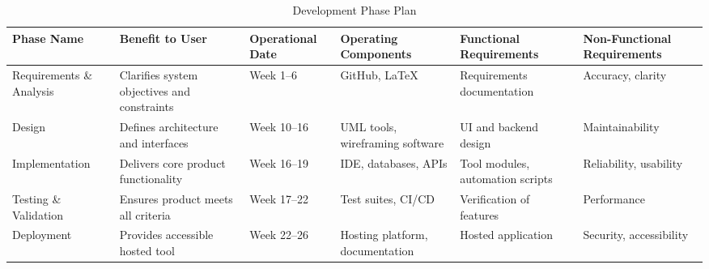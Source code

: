 \documentclass[12pt]{article}
\newcommand{\lips}{\textit{Insert your content here.}}
\begin{document}
\begin{table}[h!]
\centering
\caption{Development Phase Plan}
\begin{tabularx}{\textwidth}{lXlXlX}
\toprule
\textbf{Phase Name} & \textbf{Benefit to User} & \textbf{Operational Date} & \textbf{Operating Components} & \textbf{Functional Requirements} & \textbf{Non-Functional Requirements} \\
\midrule
Requirements \& Analysis & Clarifies system objectives and constraints & Week 1–6 & GitHub, LaTeX & Requirements documentation & Accuracy, clarity \\
Design & Defines architecture and interfaces & Week 10–16 & UML tools, wireframing software & UI and backend design & Maintainability \\
Implementation & Delivers core product functionality & Week 16–19 & IDE, databases, APIs & Tool modules, automation scripts & Reliability, usability \\
Testing \& Validation & Ensures product meets all criteria & Week 17–22 & Test suites, CI/CD & Verification of features & Performance \\
Deployment & Provides accessible hosted tool & Week 22–26 & Hosting platform, documentation & Hosted application & Security, accessibility \\
\bottomrule
\end{tabularx}
\end{table}


\end{document}
